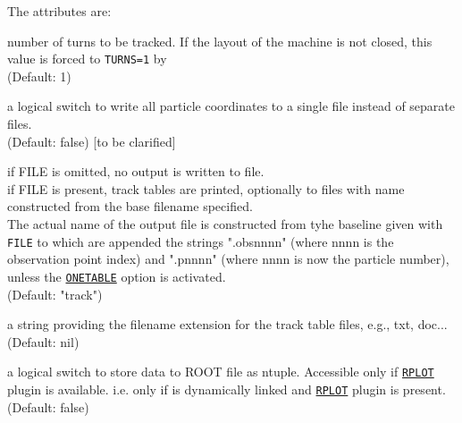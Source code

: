 The attributes are:
\begin{madlist}
    number of turns to be tracked. If the layout of the
   machine is not closed, this value is forced to \texttt{TURNS=1} by \ptc 
   \\ (Default: 1)
     
   \label{opt:onetable2} a logical switch to write all
   particle coordinates to a single file instead of separate files. \\
   (Default: false) [to be clarified]

    if FILE is omitted, no output is written to file.\\
   if FILE is present, track tables are printed, optionally to 
   files with name constructed from the base filename specified. \\
   The actual name of the output file is constructed from
   tyhe baseline given with \texttt{FILE} to which are appended the
   strings ".obsnnnn" (where nnnn is the observation point index) and
   ".pnnnn" (where nnnn is now the particle number), unless the
   \hyperref[opt:onetable2]{\texttt{ONETABLE}} option is activated.  \\
   (Default: "track") 

    a string providing the filename extension for the
   track table files, e.g., txt, doc...  \\ (Default: nil)

    a logical switch to store data to ROOT file as
   ntuple. Accessible only if \hyperref[sec:rplot]{\texttt{RPLOT}} plugin is
   available. i.e. only if \madx is dynamically linked and
   \hyperref[sec:rplot]{\texttt{RPLOT}} plugin is present. \\ 
   (Default: false)


\end{madlist}
